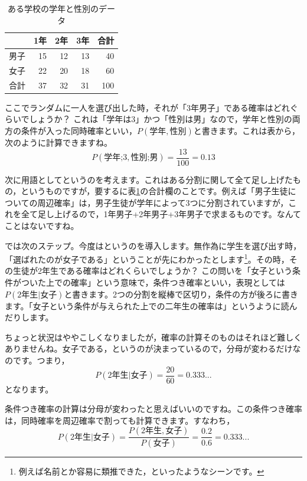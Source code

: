 \documentclass{ltjsarticle}
\begin{document}
\begin{table}[ht]
    \centering
    \caption{ある学校の学年と性別のデータ} 
    \begin{tabular}{rrrrr}
      \hline
      & 1年 & 2年 & 3年 & 合計 \\
    \hline
    男子 & 15 & 12 & 13 & 40\\
    女子 & 22 & 20 & 18 & 60\\\hline
    合計 & 37 & 32 & 31 & 100\\\hline
    \end{tabular}
      \label{tbl::24_02}
\end{table}

ここでランダムに一人を選び出した時，それが「3年男子」である確率はどれぐらいでしょうか？ これは「学年は3」かつ「性別は男」なので，学年と性別の両方の条件が入った同時確率といい，$P(\mbox{学年},\mbox{性別})$と書きます。これは表から，次のように計算できますね。
\[ P(\mbox{学年;3},\mbox{性別;男})= \frac{13}{100}=0.13 \]

次に用語としてというのを考えます。これはある分割に関して全て足し上げたもの，というものですが，要するに表\ref{tbl::24_02}の合計欄のことです。例えば「男子生徒についての周辺確率」は，男子生徒が学年によって3つに分割されていますが，これを全て足し上げるので，1年男子+2年男子+3年男子で求まるものです。なんてことはないですね。

では次のステップ。今度はというのを導入します。無作為に学生を選び出す時，「選ばれたのが女子である」ということが先にわかったとします\footnote{例えば名前とか容易に類推できた，といったようなシーンです。}。その時，その生徒が2年生である確率はどれくらいでしょうか？ この問いを「女子という条件がついた上での確率」という意味で，条件つき確率といい，表現としては$P(\mbox{2年生}|\mbox{女子})$と書きます。2つの分割を縦棒で区切り，条件の方が後ろに書きます。「女子という条件が与えられた上での二年生の確率は」というように読んだりします。

ちょっと状況はややこしくなりましたが，確率の計算そのものはそれほど難しくありませんね。女子である，というのが決まっているので，分母が変わるだけなのです。つまり，
\[P(\mbox{2年生}|\mbox{女子})=\frac{20}{60}=0.333... \]
となります。

条件つき確率の計算は分母が変わったと思えばいいのですね。この条件つき確率は，同時確率を周辺確率で割っても計算できます。すなわち，
\[ P(\mbox{2年生}|\mbox{女子}) = \frac{P(\mbox{2年生},\mbox{女子})}{P(\mbox{女子})}=\frac{0.2}{0.6}=0.333... \]
\end{document}
